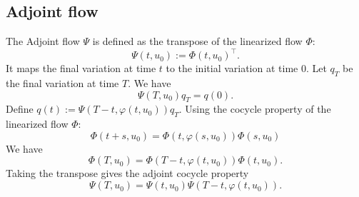 \documentclass[11pt,a4paper]{article}
\begin{document}
\subsection{Adjoint flow}
The Adjoint flow $\Psi$ is defined as the transpose of the linearized flow $\Phi$:
\begin{equation*}
    \Psi(t,u_0) := \Phi(t,u_0)^\top.
\end{equation*}
It maps the final variation at time $t$ to the initial variation at time $0$. Let $q_T$ be the final variation at time $T$. We have \begin{equation*}
    \Psi(T,u_0)q_T = q(0).
\end{equation*}
Define $q(t) := \Psi(T-t,\varphi(t,u_0))q_T$.
Using the cocycle property of the linearized flow $\Phi$:
\begin{equation*}
    \Phi(t+s,u_0) = \Phi(t,\varphi(s,u_0))\Phi(s,u_0)
\end{equation*}
We have
\begin{equation*}
    \Phi(T,u_0) = \Phi(T-t,\varphi(t,u_0))\Phi(t,u_0).
\end{equation*}
Taking the transpose gives the adjoint cocycle property \begin{equation*}
    \Psi(T,u_0) = \Psi(t,u_0)\Psi(T-t,\varphi(t,u_0)).
\end{equation*}
\end{document}
